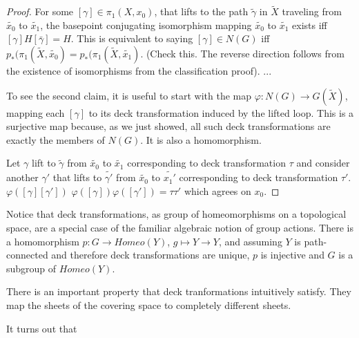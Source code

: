 \documentclass[10pt]{article}
\begin{document}
\begin{proof}
	For some $[\gamma] \in \pi_1(X, x_0)$, that lifts to the path $\tilde{\gamma}$ in
	$\tilde{X}$ traveling from $\tilde{x_0}$ to $\tilde{x_1}$, the basepoint
	conjugating isomorphism mapping $\tilde{x_0}$ to $\tilde{x_1}$ exists iff
	$[\gamma]H[\bar{\gamma}] = H$. This is equivalent to saying $[\gamma] \in
	N(G)$ iff $p_*(\pi_1(\tilde{X}, \tilde{x_0}) = p_*(\pi_1(\tilde{X},
	\tilde{x_1})$. (Check this. The reverse direction follows from the existence
	of isomorphisms from the classification proof). ...

	To see the second claim, it is useful to start with the map $\varphi: N(G) \to
	G(\tilde{X})$, mapping each $[\gamma]$ to its deck transformation induced by the
	lifted loop. This is a surjective map because, as we just showed, all such deck
	transformations are exactly the members of $N(G)$. It is also a homomorphism.

	Let $\gamma$ lift to $\tilde{\gamma}$ from $\tilde{x_0}$ to $\tilde{x_1}$
	corresponding to deck transformation $\tau$ and
	consider another $\gamma'$ that lifts to $\tilde{\gamma'}$ from $\tilde{x_0}$
	to $\tilde{x_1'}$ corresponding to deck transformation $\tau'$.
	$\varphi([\gamma][\gamma'])$ 
	$\varphi([\gamma])\varphi([\gamma']) = \tau\tau'$ which agrees on $x_0$.

\end{proof}

Notice that deck transformations, as group of homeomorphisms on a topological
space, are a special case of the familiar algebraic notion of group actions.
There is a homomorphism $p: G \to Homeo(Y)$, $g \mapsto Y \to Y$, and assuming
$Y$ is path-connected and therefore deck transformations are unique, $p$ is
injective and $G$ is a subgroup of $Homeo(Y)$.

There is an important property that deck tranformations intuitively satisfy.
They map the sheets of the covering space to completely different sheets.


It turns out that 
\end{document}
